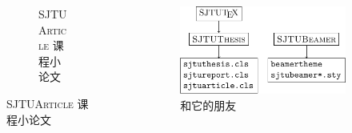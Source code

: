 \begin{frame}
\begin{columns}
\begin{column}{.45\textwidth}
\begin{figure}
\begin{subfigure}{\textwidth}
          \caption{\textsc{SJTUArticle} 课程小论文}
        \end{subfigure}
      \end{figure}
    \end{column}
    \begin{column}{.5\textwidth}
      \begin{figure}
        \includegraphics{support/figures/sjtutex.pdf}
        \caption{\SJTUTeX{} 和它的朋友}
      \end{figure}
    \end{column}
  \end{columns}


\end{frame}
